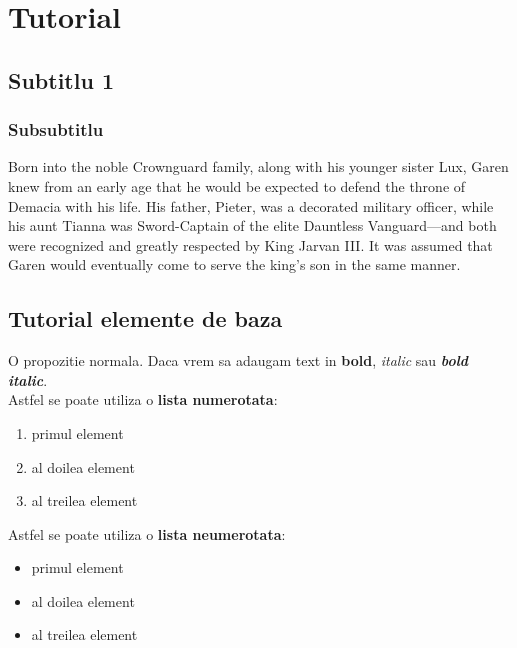 \section{Tutorial}  %

\subsection{Subtitlu 1}  %
\lipsum[1-2] %

\subsubsection{Subsubtitlu} %
\par Born into the noble Crownguard family, along with his younger sister Lux, Garen knew from an early age that he would be expected to defend the throne of Demacia with his life. His father, Pieter, was a decorated military officer, while his aunt Tianna was Sword-Captain of the elite Dauntless Vanguard—and both were recognized and greatly respected by King Jarvan III. It was assumed that Garen would eventually come to serve the king’s son in the same manner.

\subsection{Tutorial elemente de baza}
\par O propozitie normala. Daca vrem sa adaugam text in \textbf{bold}, \textit{italic} sau \textbf{\textit{bold italic}}. \\ %
Astfel se poate utiliza o \textbf{lista numerotata}:

\begin{enumerate}
    \item primul element
    \item al doilea element
    \item al treilea element
\end{enumerate}
Astfel se poate utiliza o \textbf{lista neumerotata}:

\begin{itemize}
    \item primul element
    \item al doilea element
    \item al treilea element
\end{itemize}

